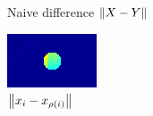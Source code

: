 \documentclass{beamer}
\begin{document}
\begin{frame}
\begin{figure}
\begin{minipage}[b]{0.40\linewidth}
      \caption{Naive difference $\left\lVert X-Y\right\rVert$}
    \end{minipage}
    \hfill
    \begin{minipage}[b]{0.40\linewidth}
      \centering
      \includegraphics[width=\textwidth]{./Images/GraphMatch/normMap.png}
      \caption{$\left\lVert x_i - x_{\rho(i)}\right\rVert$}
    \end{minipage}
  \end{figure}
\end{frame}


  


\end{document}
